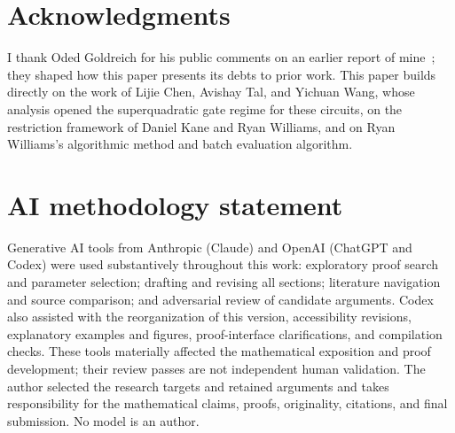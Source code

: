 \documentclass[11pt,letterpaper]{article}
\theoremstyle{definition}
\theoremstyle{remark}
\begin{document}
\section*{Acknowledgments}
I thank Oded Goldreich for his public comments on an earlier report of
mine~\cite{NagCubic}; they shaped how this paper presents its debts to
prior work. This paper builds directly on the work of Lijie Chen,
Avishay Tal, and Yichuan Wang, whose analysis opened the superquadratic
gate regime for these circuits, on the restriction framework of Daniel
Kane and Ryan Williams, and on Ryan Williams's algorithmic method
and batch evaluation algorithm.

\section*{AI methodology statement}
Generative AI tools from Anthropic (Claude) and OpenAI (ChatGPT and
Codex) were used substantively throughout this work: exploratory
proof search and parameter selection; drafting and revising all
sections; literature navigation and source comparison; and adversarial
review of candidate arguments. Codex also assisted with the reorganization of this version,
accessibility revisions, explanatory examples and figures,
proof-interface clarifications, and compilation checks.
These tools materially affected the mathematical exposition and proof
development; their review passes are not independent human validation.
The author selected the research targets and retained arguments and
takes responsibility for the mathematical claims, proofs, originality,
citations, and final submission. No model is an author.
\end{document}
